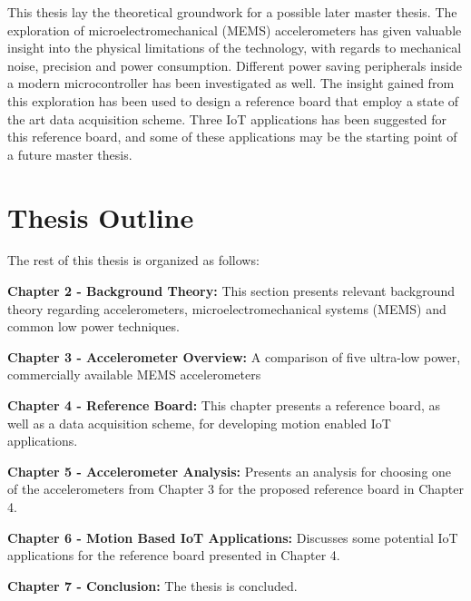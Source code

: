 This thesis lay the theoretical groundwork for a possible later master thesis. The exploration of microelectromechanical (MEMS) accelerometers has given valuable insight into the physical limitations of the technology, with regards to mechanical noise, precision and power consumption. Different power saving peripherals inside a modern microcontroller has been investigated as well. The insight gained from this exploration has been used to design a reference board that employ a state of the art data acquisition scheme. Three IoT applications has been suggested for this reference board, and some of these applications may be the starting point of a future master thesis.

\newpage

\section{Thesis Outline}

The rest of this thesis is organized as follows:

\textbf{Chapter 2 - Background Theory:} This section presents relevant background theory regarding accelerometers, microelectromechanical systems (MEMS) and common low power techniques.  

\textbf{Chapter 3 - Accelerometer Overview:} A comparison of five ultra-low power, commercially available MEMS accelerometers

\textbf{Chapter 4 - Reference Board:} This chapter presents a reference board, as well as a data acquisition scheme, for developing motion enabled IoT applications.

\textbf{Chapter 5 - Accelerometer Analysis:} Presents an analysis for choosing one of the accelerometers from Chapter 3 for the proposed reference board in Chapter 4.

\textbf{Chapter 6 - Motion Based IoT Applications:} Discusses some potential IoT applications for the reference board presented in Chapter 4.

\textbf{Chapter 7 - Conclusion:} The thesis is concluded.


